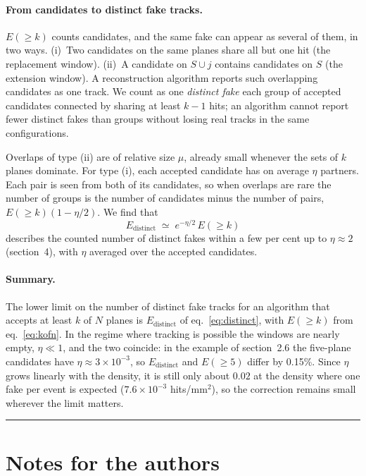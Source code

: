 \documentclass[a4paper,11pt]{article}
\begin{document}
\paragraph{From candidates to distinct fake tracks.} $E(\ge k)$ counts candidates, and the
same fake can appear as several of them, in two ways. (i)~Two candidates on the same planes
share all but one hit (the replacement window). (ii)~A candidate on $S\cup j$ contains
candidates on $S$ (the extension window). A reconstruction algorithm reports such overlapping
candidates as one track. We count as one \emph{distinct fake} each group of accepted candidates
connected by sharing at least $k-1$ hits; an algorithm cannot report fewer distinct fakes than
groups without losing real tracks in the same configurations.

Overlaps of type (ii) are of relative size $\mu$, already small whenever the sets of $k$ planes
dominate. For type (i), each accepted candidate has on average $\eta$ partners. Each pair is
seen from both of its candidates, so when overlaps are rare the number of groups is the number
of candidates minus the number of pairs, $E(\ge k)(1-\eta/2)$. We find that
\begin{equation}
  E_\mathrm{distinct} \;\simeq\; e^{-\eta/2}\,E(\ge k)
  \label{eq:distinct}
\end{equation}
describes the counted number of distinct fakes within a few per cent up to $\eta\approx2$
(section~4), with $\eta$ averaged over the accepted candidates.

\paragraph{Summary.} The lower limit on the number of distinct fake tracks for an algorithm
that accepts at least $k$ of $N$ planes is $E_\mathrm{distinct}$ of eq.~\eqref{eq:distinct},
with $E(\ge k)$ from eq.~\eqref{eq:kofn}. In the regime where tracking is possible the windows
are nearly empty, $\eta\ll1$, and the two coincide: in the example of section~2.6 the
five-plane candidates have $\eta\approx3\times10^{-3}$, so $E_\mathrm{distinct}$ and $E(\ge5)$
differ by 0.15\%. Since $\eta$ grows linearly with the density, it is still only about
$0.02$ at the density where one fake per event is expected ($7.6\times10^{-3}$ hits/mm$^2$),
so the correction remains small wherever the limit matters.

\vspace{2ex}\hrule\vspace{2ex}
\section*{Notes for the authors}
\end{document}
